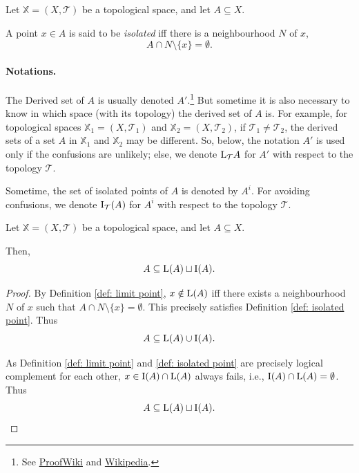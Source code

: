 \begin{definition}
	\label{def: isolated point}
	Let $\mathbb X = (X, \mathcal T)$ be a topological space, and let $A \subseteq X$.
	
	A point $x \in A$ is said to be \textit{isolated} iff there is a neighbourhood $N$ of $x$,
	$$
	A \cap N \setminus \{x\} = \emptyset.
	$$
\end{definition}


\paragraph{Notations.}
The Derived set of $A$ is usually denoted $A'$.\footnote{See \href{https://proofwiki.org/wiki/Definition:Derived_Set}{ProofWiki} and \href{https://en.wikipedia.org/wiki/Derived_set_(mathematics)}{Wikipedia}.}
But sometime it is also necessary to know in which space (with its topology) the derived set of $A$ is. For example, for topological spaces $\mathbb X_1 = (X, \mathcal T_1)$ and $\mathbb X_2 = (X, \mathcal T_2)$, if $\mathcal T_1 \ne \mathcal T_2$, the derived sets of a set $A$ in $\mathbb X_1$ and $\mathbb X_2$ may be different. So, below, the notation $A'$ is used only if the confusions are unlikely; else, we denote $\mathrm{L}_\mathcal T A$ for $A'$ with respect to the topology $\mathcal T$.

Sometime, the set of isolated points of $A$ is denoted by $A^i$. For avoiding confusions, we denote $\mathrm{I}_\mathcal T(A)$ for $A^i$ with respect to the topology $\mathcal T$.


\begin{corollary}
	\label{col: disjoint union of isolated set and derived set}
	Let $\mathbb X = (X, \mathcal T)$ be a topological space, and let $A \subseteq X$. 
	
	Then,
	$$
	A \subseteq \mathrm{L} (A) \sqcup \mathrm{I} (A).
	$$
	
	\begin{proof}
		By Definition \ref{def: limit point}, $x \notin \mathrm{L}(A)$ iff there exists a neighbourhood $N$ of $x$ such that $A \cap N \setminus \{x\} = \emptyset$. This precisely satisfies Definition \ref{def: isolated point}. Thus
		$$
		A \subseteq \mathrm{L}(A) \cup \mathrm{I}(A).
		$$
		
		As Definition \ref{def: limit point} and \ref{def: isolated point} are precisely logical complement for each other, $x \in \mathrm{I} (A) \cap \mathrm{L}(A)$ always fails, i.e., $\mathrm{I}(A) \cap \mathrm{L}(A) = \emptyset$. Thus
		$$
		A \subseteq \mathrm{L} (A) \sqcup \mathrm{I} (A).
		$$
	\end{proof}
\end{corollary}


